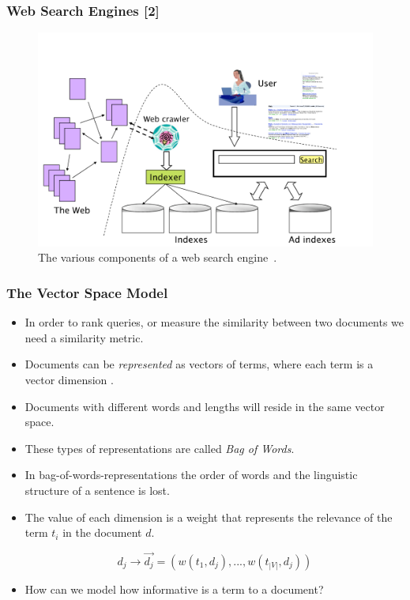 \documentclass[handout]{beamer}
\begin{document}
\begin{frame}\frametitle{Web Search Engines [2]}

\begin{figure}[h!]
	\centering
	\includegraphics[scale=0.25]{pics/searchengine.png}
	\caption{ The various components of a web search engine~\cite{manning2008}.}
\end{figure}

\end{frame}

\begin{frame}\frametitle{The Vector Space Model}
\footnotesize{
\begin{itemize}
 \item In order to rank queries, or measure the similarity between two documents we need a similarity metric.
 \item Documents can be \textit{represented} as vectors of terms, where each term is a vector dimension \cite{salton1975vector}. 
 \item Documents with different words and lengths will reside in the same vector space.
 \item These types of representations are called \emph{Bag of Words}.
 \item In bag-of-words-representations the order of words and the linguistic structure of a sentence is lost. 
 \item The value of each dimension is a weight that represents the relevance of the term $t_{i}$ in the document $d$.

\begin{equation}
 d_{j} \rightarrow \overrightarrow{d_{j}}=(w(t_{1},d_{j}),...,w(t_{|V|},d_{j}))
\end{equation}

\item How can we model how informative is a term to a document?
 
\end{itemize}

}
 
\end{frame}
\end{document}
